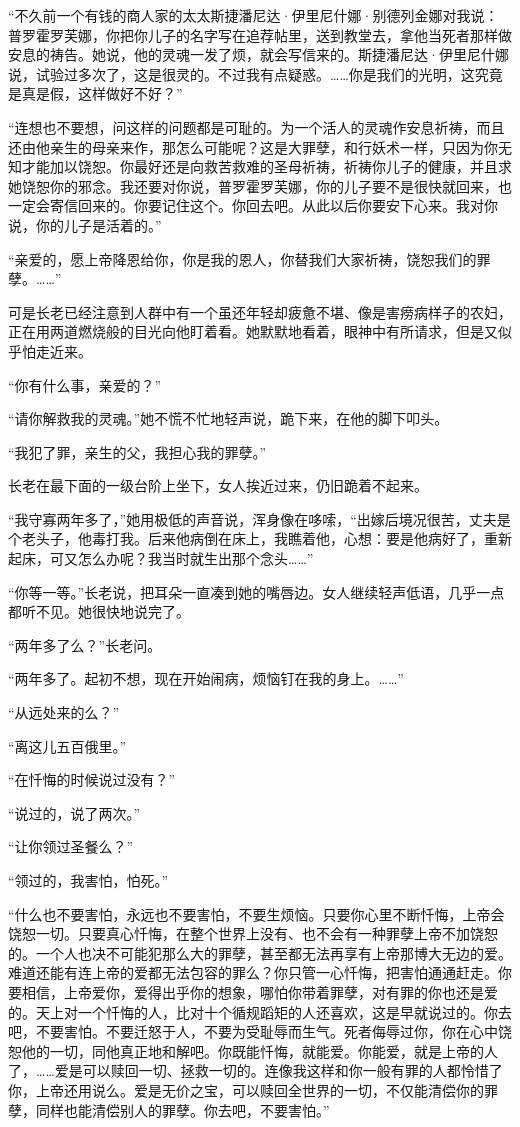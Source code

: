 \par “不久前一个有钱的商人家的太太斯捷潘尼达·伊里尼什娜·别德列金娜对我说：普罗霍罗芙娜，你把你儿子的名字写在追荐帖里，送到教堂去，拿他当死者那样做安息的祷告。她说，他的灵魂一发了烦，就会写信来的。斯捷潘尼达·伊里尼什娜说，试验过多次了，这是很灵的。不过我有点疑惑。……你是我们的光明，这究竟是真是假，这样做好不好？”
\par “连想也不要想，问这样的问题都是可耻的。为一个活人的灵魂作安息祈祷，而且还由他亲生的母亲来作，那怎么可能呢？这是大罪孽，和行妖术一样，只因为你无知才能加以饶恕。你最好还是向救苦救难的圣母祈祷，祈祷你儿子的健康，并且求她饶恕你的邪念。我还要对你说，普罗霍罗芙娜，你的儿子要不是很快就回来，也一定会寄信回来的。你要记住这个。你回去吧。从此以后你要安下心来。我对你说，你的儿子是活着的。”
\par “亲爱的，愿上帝降恩给你，你是我的恩人，你替我们大家祈祷，饶恕我们的罪孽。……”
\par 可是长老已经注意到人群中有一个虽还年轻却疲惫不堪、像是害痨病样子的农妇，正在用两道燃烧般的目光向他盯着看。她默默地看着，眼神中有所请求，但是又似乎怕走近来。
\par “你有什么事，亲爱的？”
\par “请你解救我的灵魂。”她不慌不忙地轻声说，跪下来，在他的脚下叩头。
\par “我犯了罪，亲生的父，我担心我的罪孽。”
\par 长老在最下面的一级台阶上坐下，女人挨近过来，仍旧跪着不起来。
\par “我守寡两年多了，”她用极低的声音说，浑身像在哆嗦，“出嫁后境况很苦，丈夫是个老头子，他毒打我。后来他病倒在床上，我瞧着他，心想：要是他病好了，重新起床，可又怎么办呢？我当时就生出那个念头……”
\par “你等一等。”长老说，把耳朵一直凑到她的嘴唇边。女人继续轻声低语，几乎一点都听不见。她很快地说完了。
\par “两年多了么？”长老问。
\par “两年多了。起初不想，现在开始闹病，烦恼钉在我的身上。……”
\par “从远处来的么？”
\par “离这儿五百俄里。”
\par “在忏悔的时候说过没有？”
\par “说过的，说了两次。”
\par “让你领过圣餐么？”
\par “领过的，我害怕，怕死。”
\par “什么也不要害怕，永远也不要害怕，不要生烦恼。只要你心里不断忏悔，上帝会饶恕一切。只要真心忏悔，在整个世界上没有、也不会有一种罪孽上帝不加饶恕的。一个人也决不可能犯那么大的罪孽，甚至都无法再享有上帝那博大无边的爱。难道还能有连上帝的爱都无法包容的罪么？你只管一心忏悔，把害怕通通赶走。你要相信，上帝爱你，爱得出乎你的想象，哪怕你带着罪孽，对有罪的你也还是爱的。天上对一个忏悔的人，比对十个循规蹈矩的人还喜欢，这是早就说过的。你去吧，不要害怕。不要迁怒于人，不要为受耻辱而生气。死者侮辱过你，你在心中饶恕他的一切，同他真正地和解吧。你既能忏悔，就能爱。你能爱，就是上帝的人了，……爱是可以赎回一切、拯救一切的。连像我这样和你一般有罪的人都怜惜了你，上帝还用说么。爱是无价之宝，可以赎回全世界的一切，不仅能清偿你的罪孽，同样也能清偿别人的罪孽。你去吧，不要害怕。”
